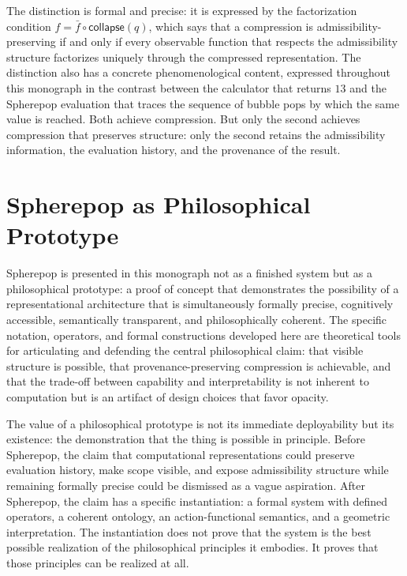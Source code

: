 \documentclass[12pt,openany]{book}
\theoremstyle{plain}
\theoremstyle{definition}
\theoremstyle{remark}
\newcommand{\scollapse}[1]{\mathsf{collapse}\!\left(#1\right)}
\begin{document}
The distinction is formal and precise: it is expressed by the factorization condition $f = \bar{f} \circ \scollapse{q}$, which says that a compression is admissibility-preserving if and only if every observable function that respects the admissibility structure factorizes uniquely through the compressed representation. The distinction also has a concrete phenomenological content, expressed throughout this monograph in the contrast between the calculator that returns $13$ and the Spherepop evaluation that traces the sequence of bubble pops by which the same value is reached. Both achieve compression. But only the second achieves compression that preserves structure: only the second retains the admissibility information, the evaluation history, and the provenance of the result.

\section*{Spherepop as Philosophical Prototype}

Spherepop is presented in this monograph not as a finished system but as a philosophical prototype: a proof of concept that demonstrates the possibility of a representational architecture that is simultaneously formally precise, cognitively accessible, semantically transparent, and philosophically coherent. The specific notation, operators, and formal constructions developed here are theoretical tools for articulating and defending the central philosophical claim: that visible structure is possible, that provenance-preserving compression is achievable, and that the trade-off between capability and interpretability is not inherent to computation but is an artifact of design choices that favor opacity.

The value of a philosophical prototype is not its immediate deployability but its existence: the demonstration that the thing is possible in principle. Before Spherepop, the claim that computational representations could preserve evaluation history, make scope visible, and expose admissibility structure while remaining formally precise could be dismissed as a vague aspiration. After Spherepop, the claim has a specific instantiation: a formal system with defined operators, a coherent ontology, an action-functional semantics, and a geometric interpretation. The instantiation does not prove that the system is the best possible realization of the philosophical principles it embodies. It proves that those principles can be realized at all.
\end{document}
